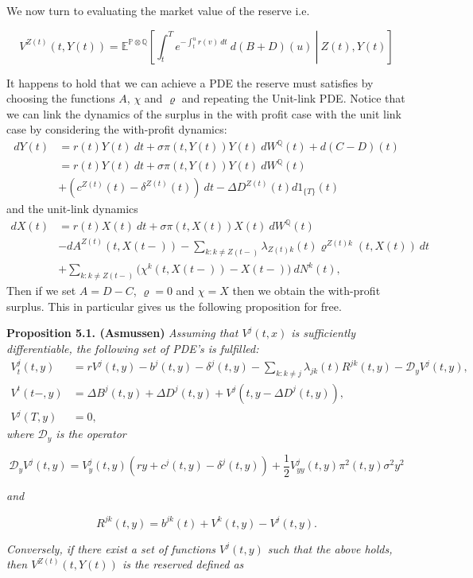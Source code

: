 \documentclass[a4paper,12pt,openany]{book}
\begin{document}
We now turn to evaluating the market value of the reserve i.e.

\[
V^{Z(t)}(t,Y(t))=\mathbb E^{\mathbb P\otimes \mathbb Q}\left[\left.\int_t^Te^{-\int_t^u r(v)\ dt}\ d(B+D)(u)\ \right\vert\ Z(t),Y(t)\right]
\]

It happens to hold that we can achieve a PDE the reserve must satisfies by choosing the functions \(A\), \(\chi\) and \(\varrho\) and repeating the Unit-link PDE. Notice that we can link the dynamics of the surplus in the with profit case with the unit link case by considering the with-profit dynamics:
\begin{align*}
dY(t)&=r(t)Y(t)\ dt + \sigma\pi(t,Y(t)) Y(t)\ dW^\mathbb Q(t) + d(C-D)(t)\\
&=r(t)Y(t)\ dt + \sigma\pi(t,Y(t)) Y(t)\ dW^\mathbb Q(t)\\
&+(c^{Z(t)}(t)-\delta^{Z(t)}(t))\ dt-\Delta D^{Z(t)}(t)d1_{\{T\}}(t)
\end{align*}
and the unit-link dynamics
\begin{align*}
dX(t)&=r(t)X(t)\ dt + \sigma\pi(t,X(t)) X(t)\ dW^\mathbb Q(t)\\
&-dA^{Z(t)}(t,X(t-))-\sum_{k:k\ne Z(t-)}\lambda_{Z(t)k}(t)\varrho^{Z(t)k}(t,X(t))\ dt\\
&+\sum_{k:k\ne Z(t-)}\Big(\chi^k(t,X(t-))-X(t-)\Big)\ dN^k(t),
\end{align*}
Then if we set \(A=D-C\), \(\varrho=0\) and \(\chi = X\) then we obtain the with-profit surplus. This in particular gives us the following proposition for free.

\textbf{Proposition 5.1. (Asmussen)} \emph{Assuming that \(V^j(t,x)\) is sufficiently differentiable, the following set of PDE's is fulfilled:}
\begin{align*}
V_t^j(t,y)&=rV^j(t,y)-b^j(t,y)-\delta^j(t,y)-\sum_{k:k\ne j}\lambda_{jk}(t)R^{jk}(t,y)-\mathcal D_y V^j(t,y),\\
V^t(t-,y)&=\Delta B^j(t,y)+\Delta D^j(t,y)+V^j(t,y-\Delta D^j(t,y)),\\
V^j(T,y)&=0,
\end{align*}
\emph{where \(\mathcal D_y\) is the operator}

\[
\mathcal D_yV^j(t,y)=V_y^j(t,y)\left(ry+c^j(t,y)-\delta^j(t,y)\right)+\frac{1}{2}V^j_{yy}(t,y)\pi^2(t,y)\sigma^2y^2
\]

\emph{and}

\[
R^{jk}(t,y)=b^{jk}(t)+V^k(t,y)-V^j(t,y).
\]

\emph{Conversely, if there exist a set of functions \(V^j(t,y)\) such that the above holds, then \(V^{Z(t)}(t,Y(t))\) is the reserved defined as}
\end{document}
